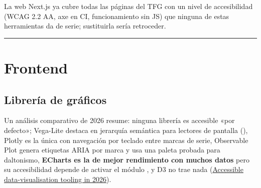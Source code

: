 La web Next.js ya cubre todas las páginas del TFG con un nivel de accesibilidad (WCAG 2.2 AA, axe en CI, funcionamiento sin JS) que ninguna de estas herramientas da de serie; sustituirla sería retroceder.

\medskip\noindent\textcolor{muted!40}{\rule{\linewidth}{0.3pt}}\medskip

\section{Frontend}

\subsection{Librería de gráficos}

Un análisis comparativo de 2026 resume: ninguna librería es accesible «por defecto»; Vega-Lite destaca en jerarquía semántica para lectores de pantalla (), Plotly es la única con navegación por teclado entre marcas de serie, Observable Plot genera etiquetas ARIA por marca y usa una paleta probada para daltonismo, \textbf{ECharts es la de mejor rendimiento con muchos datos} pero su accesibilidad depende de activar el módulo , y D3 no trae nada (\href{https://www.disabilityworld.org/articles/accessible-data-viz-tooling-2026/}{Accessible data-visualisation tooling in 2026}).

